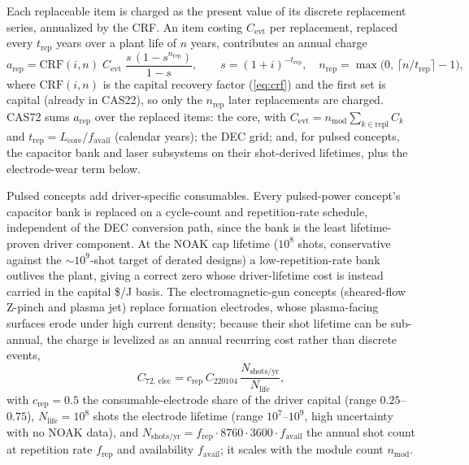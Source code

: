 \documentclass{article}
\begin{document}
Each replaceable item is charged as the present value of its discrete
replacement series, annualized by the CRF. An item costing
$C_{\text{evt}}$ per replacement, replaced every $t_{\text{rep}}$ years
over a plant life of $n$ years, contributes an annual charge
\begin{equation}
\label{eq:cas72-repl}
a_{\text{rep}} = \text{CRF}(i,n)\; C_{\text{evt}}\; \frac{s\,(1 - s^{n_{\text{rep}}})}{1 - s},
\qquad s = (1+i)^{-t_{\text{rep}}},\quad
n_{\text{rep}} = \max\!\big(0,\, \lceil n/t_{\text{rep}}\rceil - 1\big),
\end{equation}
where $\text{CRF}(i,n)$ is the capital recovery factor (\cref{eq:crf})
and the first set is capital (already in CAS22), so only the
$n_{\text{rep}}$ later replacements are charged. CAS72 sums
$a_{\text{rep}}$ over the replaced items: the core, with $C_{\text{evt}} = n_{\text{mod}}\sum_{k\in\text{repl}} C_k$
and $t_{\text{rep}} = L_{\text{core}}/f_{\text{avail}}$ (calendar years);
the DEC grid; and, for pulsed concepts, the capacitor bank and laser
subsystems on their shot-derived lifetimes, plus the electrode-wear term
below.

Pulsed concepts add driver-specific consumables. Every pulsed-power
concept's capacitor bank is replaced on a cycle-count and repetition-rate
schedule, independent of the DEC conversion path, since the bank is the
least lifetime-proven driver component. At the NOAK cap lifetime
($10^{8}$ shots, conservative against the $\sim\!10^{9}$-shot target of
derated designs) a low-repetition-rate bank outlives the plant, giving a
correct zero whose driver-lifetime cost is instead carried in the capital
\$/J basis. The electromagnetic-gun concepts (sheared-flow Z-pinch and plasma jet)
replace formation electrodes, whose plasma-facing surfaces erode under
high current density; because their shot lifetime can be sub-annual, the
charge is levelized as an annual recurring cost rather than discrete
events,
\begin{equation}
C_{72,\,\text{elec}} = c_{\text{rep}}\,C_{220104}\,
  \frac{N_{\text{shots/yr}}}{N_{\text{life}}},
\end{equation}
with $c_{\text{rep}} = 0.5$ the consumable-electrode share of the driver
capital (range $0.25$--$0.75$), $N_{\text{life}} = 10^{8}$ shots the
electrode lifetime (range $10^{7}$--$10^{9}$, high uncertainty with no
NOAK data), and $N_{\text{shots/yr}} = f_{\text{rep}}\cdot 8760\cdot
3600\cdot f_{\text{avail}}$ the annual shot count at repetition rate
$f_{\text{rep}}$ and availability $f_{\text{avail}}$; it scales with the
module count $n_{\text{mod}}$.
\end{document}
